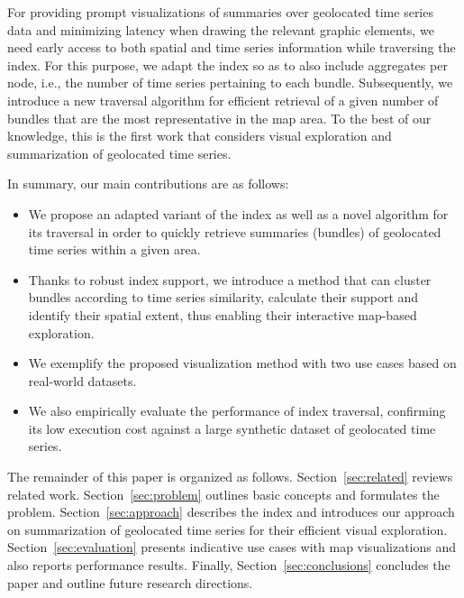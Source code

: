 For providing prompt visualizations of summaries over geolocated time series data and minimizing latency when drawing the relevant graphic elements, we need early access to both spatial and time series information while traversing the index. For this purpose, we adapt the \btsr index so as to also include aggregates per node, i.e., the number of time series pertaining to each bundle. Subsequently, we introduce a new traversal algorithm for efficient retrieval of a given number of bundles that are the most representative in the map area. To the best of our knowledge, this is the first work that considers visual exploration and summarization of geolocated time series.

In summary, our main contributions are as follows:

\begin{itemize}
 \item We propose an adapted variant of the \btsr index as well as a novel algorithm for its traversal in order to quickly retrieve summaries (bundles) of geolocated time series within a given area.
 \item Thanks to robust index support, we introduce a method that can cluster bundles according to time series similarity, calculate their support and identify their spatial extent, thus enabling their interactive map-based exploration.
 \item We exemplify the proposed visualization method with two use cases based on real-world datasets.
 \item We also empirically evaluate the performance of index traversal, confirming its low execution cost against a large synthetic dataset of geolocated time series.
\end{itemize}



The remainder of this paper is organized as follows. Section~\ref{sec:related} reviews related work. Section~\ref{sec:problem} outlines basic concepts and formulates the problem. Section~\ref{sec:approach} describes the \btsr index and introduces our approach on summarization of geolocated time series for their efficient visual exploration. Section~\ref{sec:evaluation} presents indicative use cases with map visualizations and also reports performance results. Finally, Section~\ref{sec:conclusions} concludes the paper and outline future research directions.

